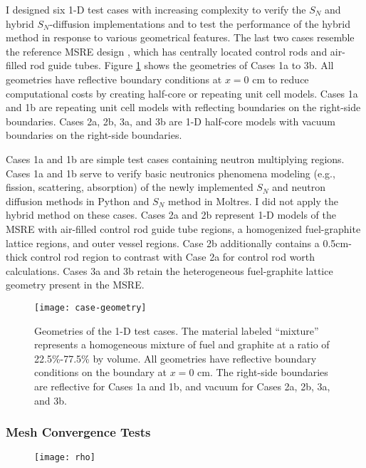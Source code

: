 I designed six 1-D test cases with increasing complexity to verify the $S_N$ and hybrid
$S_N$-diffusion implementations and to test the performance of the hybrid
method in response to various geometrical features. The last two cases resemble the
reference \gls{MSRE} design \cite{robertson_msre_1965}, which has centrally located control rods
and air-filled rod guide tubes. Figure \ref{fig:case-geom} shows the geometries of Cases 1a to
3b. All geometries have reflective boundary conditions at $x=0$ cm to reduce computational costs by
creating half-core or repeating unit cell models. Cases 1a and 1b are repeating unit
cell models with reflecting boundaries on the right-side boundaries. Cases 2a, 2b, 3a, and 3b
are 1-D half-core models with vacuum boundaries on the right-side boundaries.

Cases 1a and 1b are simple test cases containing neutron multiplying regions. Cases 1a and 1b serve
to verify basic neutronics phenomena modeling (e.g., fission, scattering, absorption) of the newly
implemented $S_N$ and neutron diffusion methods in Python and $S_N$ method in Moltres. I did not
apply the hybrid method on these cases. Cases 2a and 2b represent 1-D models of the \gls{MSRE} with
air-filled control rod guide tube regions, a homogenized fuel-graphite lattice regions, and outer
vessel regions. Case 2b additionally contains a 0.5cm-thick control rod region to contrast with
Case 2a for control rod worth calculations. Cases 3a and 3b retain the heterogeneous fuel-graphite
lattice geometry present in the \gls{MSRE}.

\begin{figure}[htb!]
  \centering
  \texttt{[image: case-geometry]}
  \caption{Geometries of the 1-D test cases. The material labeled ``mixture'' represents a
    homogeneous mixture of fuel and graphite at a ratio of 22.5\%-77.5\% by volume. All geometries
    have reflective boundary conditions on the boundary at $x=0$ cm. The right-side boundaries are
    reflective for Cases 1a and 1b, and vacuum for Cases 2a, 2b, 3a, and 3b.}
  \label{fig:case-geom}
\end{figure}

\subsubsection{Mesh Convergence Tests}

\begin{figure}[htb!]
  \centering
  \texttt{[image: rho]}
  \caption{}
  \label{fig:1d-rho}
\end{figure}

